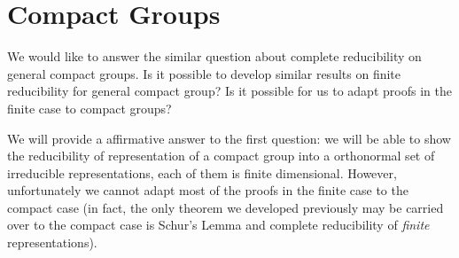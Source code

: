 
\section{Compact Groups}






We would like to answer the similar question about complete reducibility on
general compact groups.  Is it possible to develop similar results on finite
reducibility for general compact group?  Is it possible for us to adapt proofs
in the finite case to compact groups?

We will provide a affirmative answer to the first question: we will be able to
show the reducibility of representation of a compact group into a orthonormal
set of irreducible representations, each of them is finite dimensional.
However, unfortunately we cannot adapt most of the proofs in the finite case to
the compact case (in fact, the only theorem we developed previously may be
carried over to the compact case is Schur's Lemma and complete reducibility of
\emph{finite} representations).

